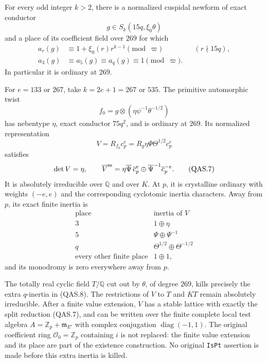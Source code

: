 \begin{theorem}
\label{thm:G127-quartic-auxiliary}
For every odd integer \(k>2\), there is a normalized cuspidal
newform of exact conductor
\[
                  g\in S_k(15q,\xi_0\theta)
 \tag{QAS.3}
\]
and a place of its coefficient field over \(269\) for which
\[
 \begin{aligned}
 a_r(g)&\equiv1+\xi_0(r)r^{k-1}\pmod\varpi
                                      &&(r\nmid15q),\\
 a_3(g)&\equiv a_5(g)\equiv a_q(g)\equiv1\pmod\varpi.
 \end{aligned}
 \tag{QAS.4}
\]
In particular it is ordinary at \(269\).

For \(e=133\) or \(267\), take \(k=2e+1=267\) or \(535\).
The primitive automorphic twist
\[
       f_0=g\otimes(\eta\psi^{-1}\theta^{-1/2})
 \tag{QAS.5}
\]
has nebentype \(\eta\), exact conductor \(75q^2\), and is
ordinary at \(269\).  Its normalized representation
\[
 V=R_{f_0}c_p^e=R_g\eta\Psi\Theta^{1/2}c_p^e
 \tag{QAS.6}
\]
satisfies
\[
 \det V=\eta,\qquad
 \overline V^{\rm ss}
   =\eta\overline\Psi\,\overline c_p^e
           \oplus\overline\Psi^{-1}\overline c_p^{-e}.
 \tag{QAS.7}
\]
It is absolutely irreducible over \(\mathbb Q\) and over \(K\).
At \(p\), it is crystalline ordinary with weights \((-e,e)\)
and the corresponding cyclotomic inertia characters.
Away from \(p\), its exact finite inertia is
\[
 \begin{array}{c|c}
 \text{place}&\text{inertia of }V\\ \hline
 3&1\oplus\eta\\
 5&\Psi\oplus\Psi^{-1}\\
 q&\Theta^{1/2}\oplus\Theta^{-1/2}\\
 \text{every other finite place}&1\oplus1,
 \end{array}
 \tag{QAS.8}
\]
and its monodromy is zero everywhere away from \(p\).

The totally real cyclic field \(T/\mathbb Q\) cut out by
\(\theta\), of degree \(269\), kills precisely the extra
\(q\)-inertia in (QAS.8).  The restrictions of \(V\) to
\(T\) and \(KT\) remain absolutely irreducible.
After a finite value extension, \(V\) has a stable lattice with
exactly the split reduction (QAS.7), and can be written over the
finite complete local test algebra
\(A=\mathbb Z_p+\mathfrak m_{E'}\) with complex conjugation
\(\operatorname{diag}(-1,1)\).
The original coefficient ring \(\mathcal O_0=\mathbb Z_p\)
containing \(i\) is not replaced: the finite value extension
and its place are part of the existence construction.
No original \texttt{IsPt} assertion is made before this
extra inertia is killed.
\end{theorem}

